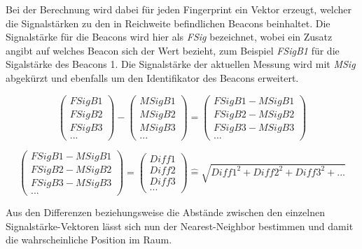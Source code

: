 Bei der Berechnung wird dabei für jeden Fingerprint ein Vektor erzeugt, welcher die Signalstärken zu den in Reichweite befindlichen Beacons beinhaltet.
Die Signalstärke für die Beacons wird hier als \emph{FSig} bezeichnet, wobei ein Zusatz angibt auf welches Beacon sich der Wert bezieht, zum Beispiel \emph{FSigB1} für die Sigalstärke des Beacons 1.
Die Signalstärke der aktuellen Messung wird mit \emph{MSig} abgekürzt und ebenfalls um den Identifikator des Beacons erweitert.


\begin{equation}
	\begin{pmatrix}
		FSigB1 \\
		FSigB2 \\
		FSigB3 \\
		...
	\end{pmatrix} -
	\begin{pmatrix}
		MSigB1 \\
		MSigB2 \\
		MSigB3 \\
		...
	\end{pmatrix}
	= 
	\begin{pmatrix}
		FSigB1 - MSigB1 \\
		FSigB2 - MSigB2 \\
		FSigB3 - MSigB3 \\
		...
	\end{pmatrix}
\end{equation}

\begin{equation}
	\begin{pmatrix}
		FSigB1 - MSigB1 \\
		FSigB2 - MSigB2 \\
		FSigB3 - MSigB3 \\
		...
	\end{pmatrix}
	=
	\begin{pmatrix}
		Diff1 \\
		Diff2 \\
		Diff3 \\
		...
	\end{pmatrix}
	\widehat{=}
	\sqrt{Diff1^2 + Diff2^2 + Diff3^2 + ...}
\end{equation}

Aus den Differenzen beziehungsweise die Abstände zwischen den einzelnen Signalstärke-Vektoren lässt sich nun der Nearest-Neighbor bestimmen und damit die wahrscheinliche Position im Raum.

